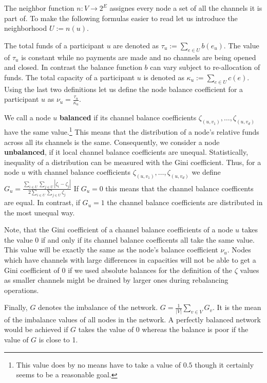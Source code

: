 \documentclass[a4paper]{paper}
\begin{document}
The neighbor function $n : V \longrightarrow 2^{E}$ assignes every node a set of all the channels it is part of.
To make the following formulas easier to read let us introduce the neighborhood $U:=n(u)$.

The total funds of a participant $u$ are denoted as $\tau_u:=\displaystyle{\sum_{e\in U}b(e_u)}$.
The value of $\tau_u$ is constant while no payments are made and no channels are being opened and closed.
In contrast the balance function $b$ can vary subject to re-allocation of funds.
The total capacity of a participant $u$ is denoted as $\kappa_u:=\displaystyle{\sum_{e\in U}c(e)}$.
Using the last two definitions let us define the node balance coefficient for a participant $u$ as $\nu_u = \frac{\tau_u}{\kappa_u}$.

We call a node $u$ {\bf balanced} if its channel balance coefficients $\zeta_{(u,v_1)},\dots,\zeta_{(u,v_d)}$ have the same value.\footnote{This value does by no means have to take a value of $0.5$ though it certainly seems to be a reasonable goal.}
This means that the distribution of a node's relative funds across all its channels is the same.
Consequently, we consider a node {\bf unbalanced}, if it local channel balance coefficients are unequal.
Statistically, inequality of a distribution can be measured with the Gini coefficient.
Thus, for a node $u$ with channel balance coefficients $\zeta_{(u,v_1)},\dots,\zeta_{(u,v_d)}$ we define $G_u = \frac{\displaystyle{\sum_{i\in U} \sum_{j \in U}} | \zeta_i - \zeta_j |}{2 \displaystyle{\sum_{i \in U} \sum_{j \in U} \zeta_j}}$
If $G_u = 0$ this means that the channel balance coefficents are equal.
In contrast, if $G_u = 1$ the channel balance coefficients are distributed in the most unequal way.

Note, that the Gini coefficient of a channel balance coefficients of a node $u$ takes the value $0$ if and only if its channel balance coefficents all take the same value.
This value will be exactly the same as the node's balance coefficient $\nu_u$.
Nodes which have channels with large differences in capacities will not be able to get a Gini coefficient of $0$ if we used absolute balances for the definition of the $\zeta$ values as smaller channels might be drained by larger ones during rebalancing operations.

Finally, $G$ denotes the imbalance of the network. $G = \displaystyle{\frac{1}{|V|}\sum_{v\in V}G_v}$. It is the mean of the imbalance values of all nodes in the network.
A perfectly balanced network would be achieved if $G$ takes the value of $0$ whereas the balance is poor if the value of $G$ is close to 1.
\end{document}
